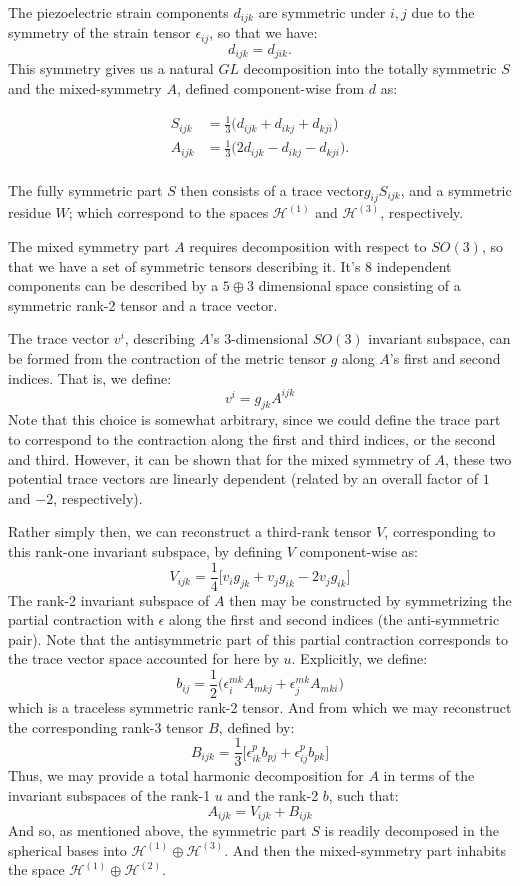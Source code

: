 \documentclass[10pt,a4paper]{article}
\begin{document}
The piezoelectric strain components $d_{ijk}$ are symmetric under $i,j$ due to the symmetry of the strain tensor $\epsilon_{ij}$, so that we have:
$$
d_{ijk}=d_{jik}.
$$
This symmetry gives us a natural $GL$ decomposition into the totally symmetric $S$ and the mixed-symmetry $A$, defined component-wise from $d$ as:

\begin{align*}
S_{ijk}&=\frac{1}{3}\big(d_{ijk}+d_{ikj}+d_{kji}\big)\\
A_{ijk}&=\frac{1}{3}\big(2d_{ijk}-d_{ikj}-d_{kji}\big).\\
\end{align*}

The fully symmetric part $S$ then consists of a trace vector$g_{ij}S_{ijk}$, and a symmetric residue $W$; which correspond to the spaces  $\mathcal{H}^{(1)}$ and $ \mathcal{H}^{(3)}$, respectively.

The mixed symmetry part $A$ requires decomposition with respect to $SO(3)$, so that we have a set of symmetric tensors describing it. It's 8 independent components can be described by a $5\oplus 3$ dimensional space consisting of a symmetric rank-2 tensor and a trace vector.

The trace vector $v^i$, describing $A$'s 3-dimensional $SO(3)$ invariant subspace, can be formed from the contraction of the metric tensor $g$ along $A$'s first and second indices. That is, we define:
$$
v^i =g_{jk}A^{ijk}
$$
Note that this choice is somewhat arbitrary, since we could define the trace part to correspond to the contraction along the first and third indices, or the second and third. However, it can be shown that for the mixed symmetry of $A$, these two potential trace vectors are linearly dependent (related by an overall factor of $1$ and $-2$, respectively).

Rather simply then, we can reconstruct a third-rank tensor $V$, corresponding to this rank-one invariant subspace, by defining $V$ component-wise as:
$$
V_{ijk} =\frac{1}{4}\big[v_i g_{jk}+ v_j g_{ik} - 2 v_j g_{ik}\big]
$$
The rank-2 invariant subspace of $A$ then may be constructed by symmetrizing the partial contraction with $\epsilon$ along the first and second indices (the anti-symmetric pair). Note that the antisymmetric part of this partial contraction corresponds to the trace vector space accounted for here by $u$. Explicitly, we define:
$$
b_{ij}=\frac{1}{2}\big(\epsilon_{i}^{mk}A_{mkj}+\epsilon_{j}^{mk}A_{mki}\big)
$$
which is a traceless symmetric rank-2 tensor. And from which we may reconstruct the corresponding rank-3 tensor $B$, defined by:
$$
B_{ijk}=\frac{1}{3}\big[ \epsilon_{ik}^p b_{pj}+\epsilon_{ij}^p b_{pk}\big]
$$
Thus, we may provide a total harmonic decomposition for $A$ in terms of the invariant subspaces of the rank-1 $u$ and the rank-2 $b$, such that:
$$
A_{ijk} = V_{ijk} + B_{ijk}
$$
And so, as mentioned above, the symmetric part $S$ is readily decomposed in the spherical bases into $\mathcal{H}^{(1)}\oplus \mathcal{H}^{(3)}$. And then the mixed-symmetry part inhabits the space $\mathcal{H}^{(1)}\oplus \mathcal{H}^{(2)}$.
\end{document}
